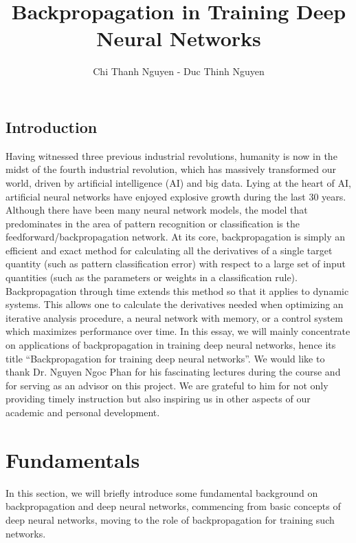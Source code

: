 \documentclass[14pt, a4paper]{article}
\title{Backpropagation in Training Deep Neural Networks}
\author{Chi Thanh Nguyen - Duc Thinh Nguyen}
\numberwithin{equation}{section}
\numberwithin{algorithm}{section}
\numberwithin{figure}{section}
\begin{document}
\cleardoublepage
{}
\tableofcontents
\newpage
\listoffigures
\newpage
\listofalgorithms
\newpage
\cleardoublepage
{}

\newpage

\nocite{*}

\begin{center}
    \section*{Introduction}
\end{center}

Having witnessed three previous industrial revolutions, humanity is now in the midst of the fourth industrial revolution, which has massively transformed our world, driven by artificial intelligence (AI) and big data. Lying at the heart of AI, artificial neural networks have enjoyed explosive growth during the last 30 years. Although there have been many neural network models, the model that predominates in the area of pattern recognition or classification is the feedforward/backpropagation network. 
At its core, backpropagation is simply an efficient and exact method for calculating all the derivatives of a single target quantity (such as pattern classification error) with respect to a large set of input quantities (such as the parameters or weights in a classification rule). Backpropagation through time extends this method so that it applies to dynamic systems. This allows one to calculate the derivatives needed when optimizing an iterative analysis procedure, a neural network with memory, or a control system which maximizes performance over time. In this essay, we will mainly concentrate on applications of backpropagation in training deep neural networks, hence its title “Backpropagation for training deep neural networks”.
We would like to thank Dr. Nguyen Ngoc Phan for his fascinating lectures during the course and for serving as an advisor on this project. We are grateful to him for not only providing timely instruction but also inspiring us in other aspects of our academic and personal development. 

\newpage
\section{Fundamentals}

In this section, we will briefly introduce some fundamental background on backpropagation and deep neural networks, commencing from basic concepts of deep neural networks, moving to the role of backpropagation for training such networks.
\end{document}
